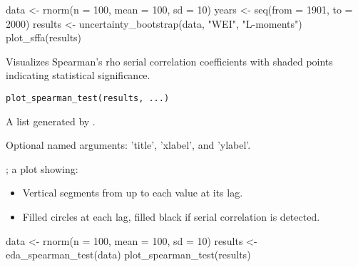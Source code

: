 \documentclass[a4paper]{book}
\begin{document}
%
\begin{Examples}
\begin{ExampleCode}
data <- rnorm(n = 100, mean = 100, sd = 10)
years <- seq(from = 1901, to = 2000)
results <- uncertainty_bootstrap(data, "WEI", "L-moments")
plot_sffa(results)

\end{ExampleCode}
\end{Examples}
%
\begin{Description}
Visualizes Spearman’s rho serial correlation coefficients with shaded points
indicating statistical significance.
\end{Description}
%
\begin{Usage}
\begin{verbatim}
plot_spearman_test(results, ...)
\end{verbatim}
\end{Usage}
%
\begin{Arguments}
\begin{ldescription}
\item[\code{results}] A list generated by .

\item[\code{...}] Optional named arguments: 'title', 'xlabel', and 'ylabel'.
\end{ldescription}
\end{Arguments}
%
\begin{Value}
; a plot showing:
\begin{itemize}

\item{} Vertical segments from  up to each \eqn{\rho}{} value at its lag.
\item{} Filled circles at each lag, filled black if serial correlation is detected.

\end{itemize}

\end{Value}
%
\begin{Examples}
\begin{ExampleCode}
data <- rnorm(n = 100, mean = 100, sd = 10)
results <- eda_spearman_test(data)
plot_spearman_test(results)

\end{ExampleCode}
\end{Examples}
\end{document}
